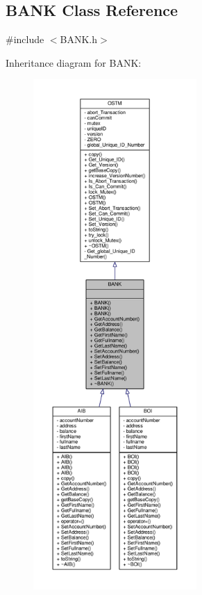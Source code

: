 \hypertarget{class_b_a_n_k}{}\subsection{B\+A\+NK Class Reference}
\label{class_b_a_n_k}


{\ttfamily \#include $<$B\+A\+N\+K.\+h$>$}



Inheritance diagram for B\+A\+NK\+:
\nopagebreak
\begin{figure}[H]
\begin{center}
\leavevmode
\includegraphics[height=550pt]{class_b_a_n_k__inherit__graph}
\end{center}
\end{figure}


